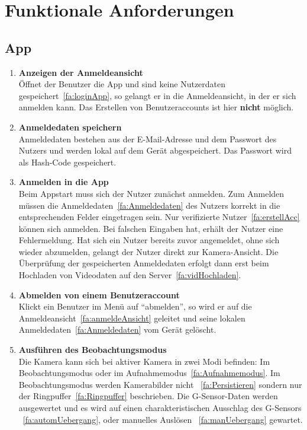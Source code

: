 \chapter{Funktionale Anforderungen}

\section{\gls{App}}
\begin{enumerate}
\renewcommand{\labelenumi}{\textbf{\theenumi}}
\renewcommand{\theenumi}{FA\arabic{enumi}0}
\setcounter{enumi}{99}
\item \label{fa:anmeldeAnsicht} \textbf{Anzeigen der Anmeldeansicht} \hfill \\
Öffnet der Benutzer die \gls{App} und sind keine Nutzerdaten gespeichert~\eqref{fa:loginApp}, so gelangt er in die Anmeldeansicht, in der er sich anmelden kann. Das Erstellen von Benutzeraccounts ist hier \textbf{nicht} möglich.

\item \label{fa:Anmeldedaten}\textbf{Anmeldedaten speichern} \hfill \\
Anmeldedaten bestehen aus der E-Mail-Adresse und dem Passwort des Nutzers und werden lokal auf dem Gerät abgespeichert. Das Passwort wird als \gls{Hash-Code} gespeichert.

\item \label{fa:loginApp} \textbf{Anmelden in die \gls{App}} \hfill \\
Beim Appstart muss sich der Nutzer zunächst anmelden. Zum Anmelden müssen die Anmeldedaten~\eqref{fa:Anmeldedaten} des Nutzers korrekt in die entsprechenden Felder eingetragen sein. Nur verifizierte Nutzer~\eqref{fa:erstellAcc} können sich anmelden. Bei falschen Eingaben hat, erhält der Nutzer eine Fehlermeldung. Hat sich ein Nutzer bereits zuvor angemeldet, ohne sich wieder abzumelden, gelangt der Nutzer direkt zur Kamera-Ansicht. Die Überprüfung der gespeicherten Anmeldedaten erfolgt dann erst beim Hochladen von Videodaten auf den Server~\eqref{fa:vidHochladen}.

\item \label{fa:logOut}\textbf{Abmelden von einem Benutzeraccount} \hfill \\
Klickt ein Benutzer im Menü auf ``abmelden'', so wird er auf die Anmeldeansicht~\eqref{fa:anmeldeAnsicht} geleitet und seine lokalen Anmeldedaten~\eqref{fa:Anmeldedaten} vom Gerät gelöscht.

\item \label{fa:Beobachtungsmodus}\textbf{Ausführen des Beobachtungsmodus} \hfill \\
Die Kamera kann sich bei aktiver Kamera in zwei Modi befinden: Im Beobachtungsmodus oder im Aufnahmemodus~\eqref{fa:Aufnahmemodus}.
Im Beobachtungsmodus werden Kamerabilder nicht ~\eqref{fa:Persistieren} sondern nur der \gls{Ringpuffer}~\eqref{fa:Ringpuffer} beschrieben. Die \gls{G-Sensor}-Daten werden ausgewertet und es wird auf einen charakteristischen Ausschlag des G-Sensors ~\eqref{fa:automUebergang}, oder manuelles Auslösen ~\eqref{fa:manUebergang} gewartet.


\end{enumerate}
